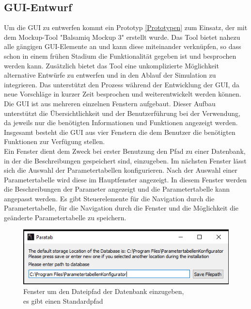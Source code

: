 \documentclass[12pt,a4paper]{article}
\begin{document}
\subsection{GUI-Entwurf}
Um die \ac{GUI} zu entwerfen kommt ein Prototyp \ref{Prototypen} zum Einsatz, der mit dem Mockup-Tool "Balsamiq Mockup 3" erstellt wurde. Das Tool bietet nahezu alle gängigen \ac{GUI}-Elemente an und kann diese miteinander verknüpfen, so dass schon in einem frühen Stadium die Funktionalität gegeben ist und besprochen werden kann. Zusätzlich bietet das Tool eine unkomplizierte Möglichkeit alternative Entwürfe zu entwerfen und in den Ablauf der Simulation zu integrieren. Das unterstützt den Prozess während der Entwicklung der \ac{GUI}, da neue Vorschläge in kurzer Zeit besprochen und weiterentwickelt werden können.\\
\newline
Die \ac{GUI} ist aus mehreren einzelnen Fenstern aufgebaut. Dieser Aufbau unterstützt die Übersichtlichkeit und der Benutzerführung bei der Verwendung, da jeweils nur die benötigten Informationen und Funktionen angezeigt werden.\\ 
Insgesamt besteht die \ac{GUI} aus vier Fenstern die dem Benutzer die benötigten Funktionen zur Verfügung stellen. \\
Ein Fenster dient dem Zweck bei erster Benutzung den Pfad zu einer Datenbank, in der die Beschreibungen gespeichert sind, einzugeben. Im nächsten Fenster lässt sich die Auswahl der Parametertabellen konfigurieren. Nach der Auswahl einer Parametertabelle wird diese im Hauptfenster angezeigt. In diesem Fenster werden die Beschreibungen der Parameter angezeigt und die Parametertabelle kann angepasst werden. Es gibt Steuerelemente für die Navigation durch die Parametertabelle, für die Navigation durch die Fenster und die Möglichkeit die geänderte Parametertabelle zu speichern.\\
\begin{figure}[H]
\includegraphics[scale=1]{pictures_and_research/Bilder/filepathWindow.PNG}
\caption{Fenster um den Dateipfad der Datenbank einzugeben,\\
es gibt einen Standardpfad}
\end{figure}
\end{document}
